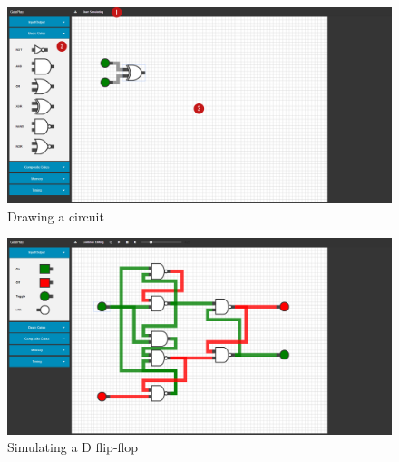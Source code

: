 \begin{figure}[p]
    \centering
    \includegraphics[width=\textheight,angle=90]{labelled.png}
    \caption{Drawing a circuit}
    \label{fig:interface}
\end{figure}

\begin{figure}[p]
    \centering
    \includegraphics[width=\textheight,angle=90]{dflipflop.png}
    \caption{Simulating a D flip-flop}
    \label{fig:dflopflop}
\end{figure}
